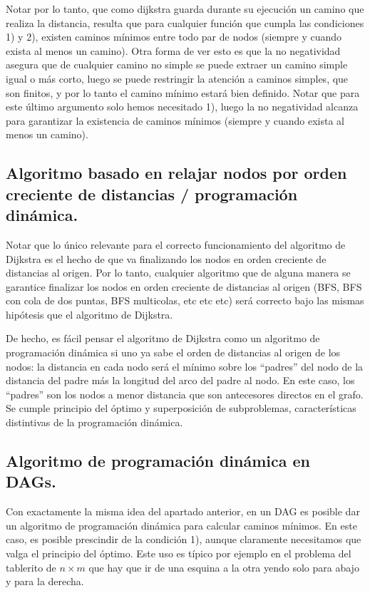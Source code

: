 \documentclass{article}
\begin{document}
Notar por lo tanto, que como dijkstra guarda durante su ejecución un camino que realiza la distancia, resulta
que para cualquier función que cumpla las condiciones 1) y 2), existen caminos mínimos entre todo par de nodos
(siempre y cuando exista al menos un camino). Otra forma de ver esto es que la no negatividad asegura que de
cualquier camino no simple se puede extraer un camino simple igual o más corto, luego se puede restringir la
atención a caminos simples, que son finitos, y por lo tanto el camino mínimo estará bien definido. Notar que
para este último argumento solo hemos necesitado 1), luego la no negatividad alcanza para garantizar la
existencia de caminos mínimos (siempre y cuando exista al menos un camino).

\subsection{Algoritmo basado en relajar nodos por orden creciente de distancias / programación dinámica.}

Notar que lo único relevante para el correcto funcionamiento del algoritmo de Dijkstra es el hecho de que va
finalizando los nodos en orden creciente de distancias al origen. Por lo tanto, cualquier algoritmo que de alguna
manera se garantice finalizar los nodos en orden creciente de distancias al origen (BFS, BFS con cola de dos puntas,
BFS multicolas, etc etc etc) será correcto bajo las mismas hipótesis que el algoritmo de Dijkstra.

De hecho, es fácil pensar el algoritmo de Dijkstra como un algoritmo de programación dinámica si uno ya sabe el
orden de distancias al origen de los nodos: la distancia en cada nodo será el mínimo sobre los ``padres'' del
nodo de la distancia del padre más la longitud del arco del padre al nodo. En este caso, los ``padres'' son los
nodos a menor distancia que son antecesores directos en el grafo. Se cumple principio del óptimo y
superposición de subproblemas, características distintivas de la programación dinámica.

\subsection{Algoritmo de programación dinámica en DAGs.}

Con exactamente la misma idea del apartado anterior, en un DAG es posible dar un algoritmo de programación dinámica
para calcular caminos mínimos. En este caso, es posible prescindir de la condición 1), aunque claramente necesitamos
que valga el principio del óptimo. Este uso es típico por ejemplo en el problema del tablerito de $n \times m$
que hay que ir de una esquina a la otra yendo solo para abajo y para la derecha.
\end{document}
